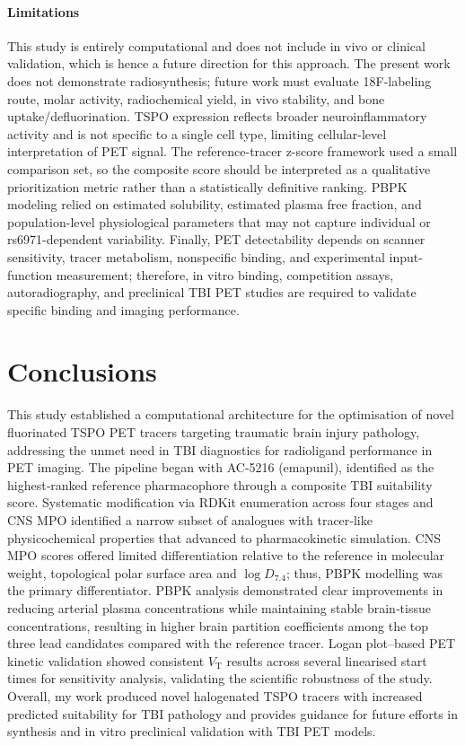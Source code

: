 \documentclass[times, twoside]{zHenriquesLab-StyleBioRxiv}
\begin{document}
		\paragraph{Limitations}
		This study is entirely computational and does not include in vivo or clinical validation, which is hence a future direction for this approach. The present work does not demonstrate radiosynthesis; future work must evaluate 18F-labeling route, molar activity, radiochemical yield, in vivo stability, and bone uptake/defluorination. TSPO expression reflects broader neuroinflammatory activity and is not specific to a single cell type, limiting cellular-level interpretation of PET signal. The reference-tracer z-score framework used a small comparison set, so the composite score should be interpreted as a qualitative prioritization metric rather than a statistically definitive ranking. PBPK modeling relied on estimated solubility, estimated plasma free fraction, and population-level physiological parameters that may not capture individual or rs6971-dependent variability. Finally, PET detectability depends on scanner sensitivity, tracer metabolism, nonspecific binding, and experimental input-function measurement; therefore, in vitro binding, competition assays, autoradiography, and preclinical TBI PET studies are required to validate specific binding and imaging performance.
		
		
		\section*{Conclusions}
		This study established a computational architecture for the optimisation of novel fluorinated TSPO PET tracers targeting traumatic brain injury pathology, addressing the unmet need in TBI diagnostics for radioligand performance in PET imaging.  The pipeline began with AC‑5216 (emapunil), identified as the highest‑ranked reference pharmacophore through a composite TBI suitability score.  Systematic modification via RDKit enumeration across four stages and CNS MPO identified a narrow subset of analogues with tracer‑like physicochemical properties that advanced to pharmacokinetic simulation.  CNS MPO scores offered limited differentiation relative to the reference in molecular weight, topological polar surface area and $\log D_{7.4}$; thus, PBPK modelling was the primary differentiator.  PBPK analysis demonstrated clear improvements in reducing arterial plasma concentrations while maintaining stable brain‑tissue concentrations, resulting in higher brain partition coefficients among the top three lead candidates compared with the reference tracer.  Logan plot–based PET kinetic validation showed consistent $V_{\mathrm{T}}$ results across several linearised start times for sensitivity analysis, validating the scientific robustness of the study.  Overall, my work produced novel halogenated TSPO tracers with increased predicted suitability for TBI pathology and provides guidance for future efforts in synthesis and in vitro preclinical validation with TBI PET models.
		
\end{document}
